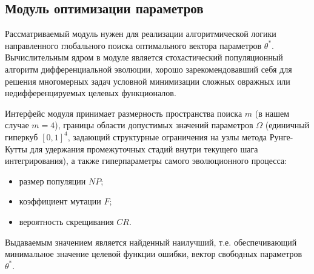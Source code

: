 \subsection{Модуль оптимизации параметров}
\label{subsec:diff_evolution}
Рассматриваемый модуль нужен для реализации алгоритмической логики направленного глобального поиска оптимального вектора параметров $\theta^*$. Вычислительным ядром в модуле является стохастический популяционный алгоритм дифференциальной эволюции, хорошо зарекомендовавший себя для решения многомерных задач условной минимизации сложных овражных или недифференцируемых целевых функционалов.

Интерфейс модуля принимает размерность пространства поиска $m$ (в нашем случае $m = 4$), границы области допустимых значений параметров $\Omega$ (единичный гиперкуб $[0, 1]^4$, задающий структурные ограничения на узлы метода Рунге-Кутты для удержания промежуточных стадий внутри текущего шага интегрирования), а также гиперпараметры самого эволюционного процесса:
\begin{itemize}
	\item размер популяции $NP$;
	\item коэффициент мутации $F$;
	\item вероятность скрещивания $CR$.
\end{itemize}
Выдаваемым значением является найденный наилучший, т.е. обеспечивающий минимальное значение целевой функции ошибки, вектор свободных параметров $\theta^*$.

